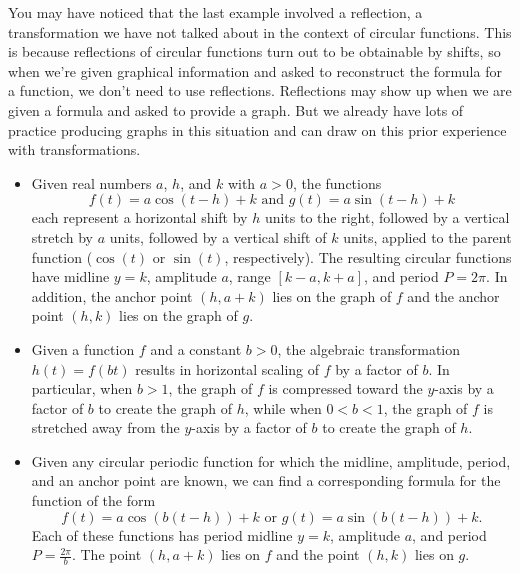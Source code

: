 \documentclass{ximera}
\begin{document}
You may have noticed that the last example involved a reflection, a transformation we have not talked about in the context of circular functions. This is because reflections of circular functions turn out to be obtainable by shifts, so when we're given graphical information and asked to reconstruct the formula for a function, we don't need to use reflections. Reflections may show up when we are given a formula and asked to provide a graph. But we already have lots of practice producing graphs in this situation and can draw on this prior experience with transformations. 

%
%
%

\begin{summary}
\begin{itemize}[label=\textbullet]
\item
Given real numbers \(a\), \(h\), and \(k\) with \(a > 0\), the functions%
\begin{equation*}
f(t) = a\cos(t-h)+k \text{ and } g(t) = a\sin(t-h) + k
\end{equation*}
each represent a horizontal shift by \(h\) units to the right, followed by a vertical stretch by \(a\) units, followed by a vertical shift of \(k\) units, applied to the parent function (\(\cos(t)\) or \(\sin(t)\), respectively).  The resulting circular functions have midline \(y = k\), amplitude \(a\), range \([k-a,k+a]\), and period \(P = 2\pi\).  In addition, the anchor point \((h,a+k)\) lies on the graph of \(f\) and the anchor point \((h,k)\) lies on the graph of \(g\).%
\item
Given a function \(f\) and a constant \(b > 0\), the algebraic transformation \(h(t) = f(bt)\) results in horizontal scaling of \(f\) by a factor of \(b\).  In particular, when \(b > 1\), the graph of \(f\) is compressed toward the \(y\)-axis by a factor of \(b\) to create the graph of \(h\), while when \(0 < b < 1\), the graph of \(f\) is stretched away from the \(y\)-axis by a factor of \(b\) to create the graph of \(h\).%
\item
Given any circular periodic function for which the midline, amplitude, period, and an anchor point are known, we can find a corresponding formula for the function of the form%
\begin{equation*}
f(t) = a\cos(b(t-h))+k \text{ or } g(t) = a\sin(b(t-h)) + k\text{.}
\end{equation*}
Each of these functions has period midline \(y = k\), amplitude \(a\), and period \(P = \frac{2\pi}{b}\).  The point \((h,a+k)\) lies on \(f\) and the point \((h,k)\) lies on \(g\).%
\end{itemize}
\end{summary}
%
%
\end{document}
